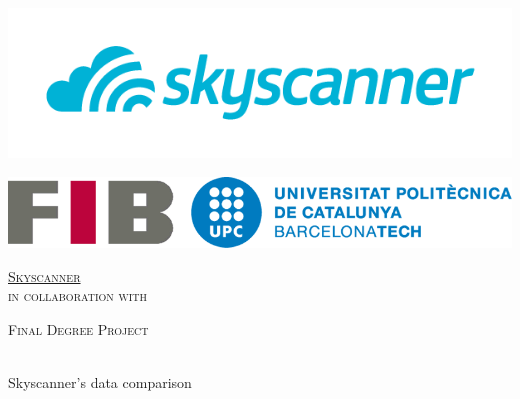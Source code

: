 \documentclass[
11pt, %
oneside, %
english,
singlespacing, %
headsepline, %
]{MastersDoctoralThesis} %
\date{\displaydate{date}}
\author{Fèlix Arribas} %
\def \company{Skyscanner}
\begin{document}

\frontmatter %

\pagestyle{plain} %


\begin{titlepage}
\begin{center}

\includegraphics[scale=0.25]{resources/logo-skyscanner.png}

\includegraphics[scale=0.1]{resources/logo-upc.png} %

\vspace*{.04\textheight}
{\scshape\LARGE \href{https://www.skyscanner.net/}{\company}\\ in collaboration with\\ \href{http://www.upc.edu}\univname\par}\vspace{1.5cm} %
\textsc{\Large Final Degree Project}\\[0.5cm] %

\HRule \\[0.4cm] %
{\Huge \bfseries \ttitle\par}\vspace{0.4cm} %
{\large Skyscanner's data comparison\par}\vspace{0.1cm} %
\HRule \\[1.5cm] %
 

\end{center}
\end{titlepage}
\end{document}
